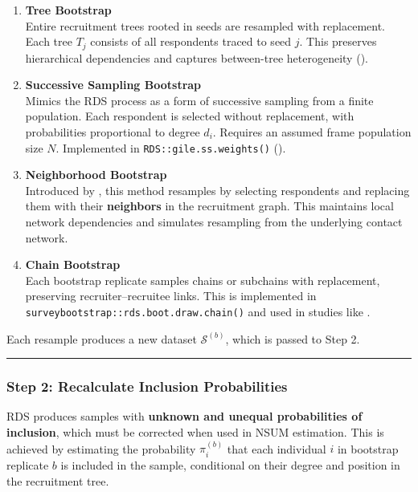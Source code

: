 \documentclass[
  12pt,
  letterpaper,
  DIV=11,
  numbers=noendperiod]{scrartcl}
\theoremstyle{plain}
\theoremstyle{definition}
\begin{document}
\begin{enumerate}
\def\labelenumi{\arabic{enumi}.}
\item
  \textbf{Tree Bootstrap}\\
  Entire recruitment trees rooted in seeds are resampled with
  replacement. Each tree \(T_j\) consists of all respondents traced to
  seed \(j\). This preserves hierarchical dependencies and captures
  between-tree heterogeneity (\textcite{salg06-variance}).
\item
  \textbf{Successive Sampling Bootstrap}\\
  Mimics the RDS process as a form of successive sampling from a finite
  population. Each respondent is selected without replacement, with
  probabilities proportional to degree \(d_i\). Requires an assumed
  frame population size \(N\). Implemented in
  \texttt{RDS::gile.ss.weights()} (\textcite{gile11-inference}).
\item
  \textbf{Neighborhood Bootstrap}\\
  Introduced by \textcite{yauc22-neighboot}, this method resamples by
  selecting respondents and replacing them with their \textbf{neighbors}
  in the recruitment graph. This maintains local network dependencies
  and simulates resampling from the underlying contact network.
\item
  \textbf{Chain Bootstrap}\\
  Each bootstrap replicate samples chains or subchains with replacement,
  preserving recruiter--recruitee links. This is implemented in
  \texttt{surveybootstrap::rds.boot.draw.chain()} and used in studies
  like \textcite{weir12-comparison}.
\end{enumerate}

Each resample produces a new dataset \(\mathcal{S}^{(b)}\), which is
passed to Step 2.

\begin{center}\rule{0.5\linewidth}{0.5pt}\end{center}

\subsubsection{Step 2: Recalculate Inclusion
Probabilities}\label{step-2-recalculate-inclusion-probabilities}

RDS produces samples with \textbf{unknown and unequal probabilities of
inclusion}, which must be corrected when used in NSUM estimation. This
is achieved by estimating the probability \(\pi_i^{(b)}\) that each
individual \(i\) in bootstrap replicate \(b\) is included in the sample,
conditional on their degree and position in the recruitment tree.
\end{document}
